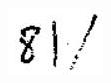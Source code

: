 \documentclass[10pt]{article}
\begin{document}
\includegraphics[max width=\textwidth]{2022_11_11_ca6a6c1a0324ee23e523g-07}
\end{document}

